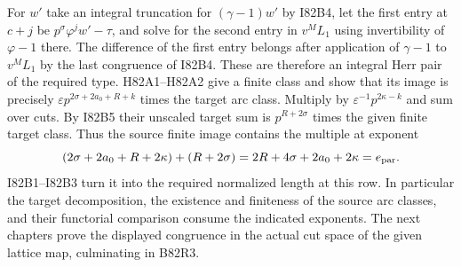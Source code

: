 For $w'$ take an integral truncation for $(\gamma-1)w'$ by
I82B4, let the first entry at $c+j$ be
$p^\sigma\varphi^j w'-\tau$, and solve for the second entry in
$v^M L_1$ using invertibility of $\varphi-1$ there. The difference
of the first entry belongs after application of $\gamma-1$ to
$v^M L_1$ by the last congruence of I82B4. These are therefore
an integral Herr pair of the required type. H82A1--H82A2 give
a finite class and show that its image is precisely
$\varepsilon p^{2\sigma+2a_0+R+k}$ times the target arc class.
Multiply by $\varepsilon^{-1}p^{2\kappa-k}$ and sum over cuts.
By I82B5 their unscaled target sum is $p^{R+2\sigma}$ times the
given finite target class. Thus the source finite image contains
the multiple at exponent
\[
    (2\sigma+2a_0+R+2\kappa)+(R+2\sigma)
       =2R+4\sigma+2a_0+2\kappa=e_{\rm par}.
\]
I82B1--I82B3 turn it into the required normalized length at this
row. In particular the target decomposition, the existence and
finiteness of the source arc classes, and their functorial comparison
consume the indicated exponents. The next chapters prove the displayed congruence in the actual
cut space of the given lattice map, culminating in B82R3.
